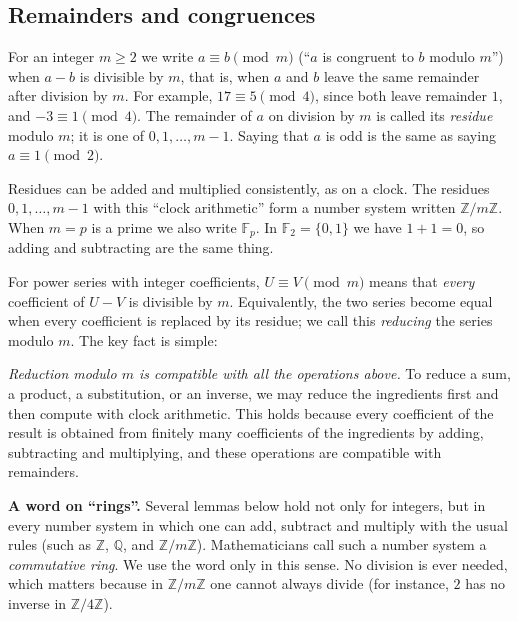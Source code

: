 \documentclass[11pt,a4paper]{article}
\theoremstyle{definition}
\theoremstyle{remark}
\newcommand{\Z}{\mathbb{Z}}
\newcommand{\Q}{\mathbb{Q}}
\newcommand{\F}{\mathbb{F}}
\newcommand{\para}[1]{\par\medskip\noindent\textbf{#1}\enspace}
\begin{document}
\subsection{Remainders and congruences}
For an integer $m\ge2$ we write $a\equiv b\pmod m$ (``$a$ is congruent to $b$ modulo $m$'') when $a-b$ is divisible by
$m$, that is, when $a$ and $b$ leave the same remainder after division by $m$. For example, $17\equiv5\pmod 4$, since both leave remainder $1$, and $-3\equiv1\pmod4$. The
remainder of $a$ on division by $m$ is called its \emph{residue} modulo $m$; it is one of $0,1,\dots,m-1$. Saying that
$a$ is odd is the same as saying $a\equiv1\pmod2$.

Residues can be added and multiplied consistently, as on a clock. The residues $0,1,\dots,m-1$ with this ``clock
arithmetic'' form a number system written $\Z/m\Z$. When $m=p$ is a prime we also write $\F_p$. In $\F_2=\{0,1\}$ we
have $1+1=0$, so adding and subtracting are the same thing.

For power series with integer coefficients, $U\equiv V\pmod m$ means that \emph{every} coefficient of $U-V$ is
divisible by $m$. Equivalently, the two series become equal when every coefficient is replaced by its residue; we call
this \emph{reducing} the series modulo $m$. The key fact is simple:

\emph{Reduction modulo $m$ is compatible with all the operations above.} To reduce a sum, a product, a substitution, or
an inverse, we may reduce the ingredients first and then compute with clock arithmetic. This holds because every
coefficient of the result is obtained from finitely many coefficients of the ingredients by adding, subtracting and
multiplying, and these operations are compatible with remainders.

\para{A word on ``rings''.} Several lemmas below hold not only for integers, but in every number system in
which one can add, subtract and multiply with the usual rules (such as $\Z$, $\Q$, and $\Z/m\Z$). Mathematicians call
such a number system a \emph{commutative ring}. We use the word only in this sense. No division is ever needed, which
matters because in $\Z/m\Z$ one cannot always divide (for instance, $2$ has no inverse in $\Z/4\Z$).
\end{document}
